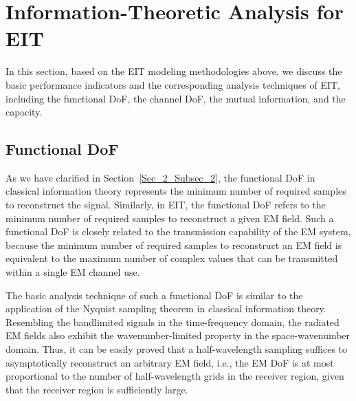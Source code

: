 \documentclass[journal,twocolumn]{IEEEtran}
\begin{document}
\section{Information-Theoretic Analysis for EIT}
In this section, based on the EIT modeling methodologies above, we discuss the basic performance indicators and the corresponding analysis techniques of EIT, including the functional DoF, the channel DoF, the mutual information, and the capacity. 

\vspace{-1em}
\subsection{Functional DoF}\label{Sec_4_Subsec_1}
As we have clarified in Section~\ref{Sec_2_Subsec_2}, the functional DoF in classical information theory represents the minimum number of required samples to reconstruct the signal. Similarly, in EIT, the functional DoF refers to the minimum number of required samples to reconstruct a given EM field. 
Such a functional DoF is closely related to the transmission capability of the EM system, because the minimum number of required samples to reconstruct an EM field is equivalent to the maximum number of complex values that can be transmitted within a single EM channel use. 

The basic analysis technique of such a functional DoF is similar to the application of the Nyquist sampling theorem in classical information theory. 
Resembling the bandlimited signals in the time-frequency domain, the radiated EM fields also exhibit the wavenumber-limited property in the space-wavenumber domain. 
Thus, it can be easily proved that a half-wavelength sampling suffices to asymptotically reconstruct an arbitrary EM field, i.e., the EM DoF is at most proportional to the number of half-wavelength grids in the receiver region, given that the receiver region is sufficiently large. 
\end{document}
